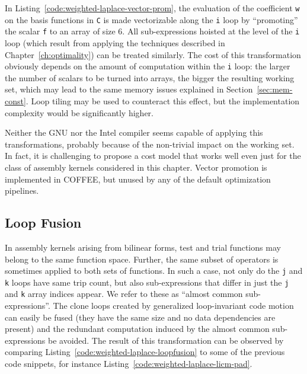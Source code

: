 In Listing~\ref{code:weighted-laplace-vector-prom}, the evaluation of the coefficient \texttt{w} on the basis functions in {\tt C} is made vectorizable along the {\tt i} loop by ``promoting'' the scalar \texttt{f} to an array of size 6. All sub-expressions hoisted at the level of the {\tt i} loop (which result from applying the techniques described in Chapter~\ref{ch:optimality}) can be treated similarly. The cost of this transformation obviously depends on the amount of computation within the {\tt i} loop: the larger the number of scalars to be turned into arrays, the bigger the resulting working set, which may lead to the same memory issues explained in Section~\ref{sec:mem-const}. Loop tiling may be used to counteract this effect, but the implementation complexity would be significantly higher. 

Neither the GNU nor the Intel compiler seems capable of applying this transformations, probably because of the non-trivial impact on the working set. In fact, it is challenging to propose a cost model that works well even just for the class of assembly kernels considered in this chapter. Vector promotion is implemented in COFFEE, but unused by any of the default optimization pipelines. 

\subsection{Loop Fusion}
\label{sec:coffee-loopfusion}

In assembly kernels arising from bilinear forms, test and trial functions may belong to the same function space. Further, the same subset of operators is sometimes applied to both sets of functions. In such a case, not only do the {\tt j} and {\tt k} loops have same trip count, but also sub-expressions that differ in just the {\tt j} and {\tt k} array indices appear. We refer to these as ``almost common sub-expressions''. The clone loops created by generalized loop-invariant code motion can easily be fused (they have the same size and no data dependencies  are present) and the redundant computation induced by the almost common sub-expressions be avoided. The result of this transformation can be observed by comparing Listing~\ref{code:weighted-laplace-loopfusion} to some of the previous code snippets, for instance Listing~\ref{code:weighted-laplace-licm-pad}.

